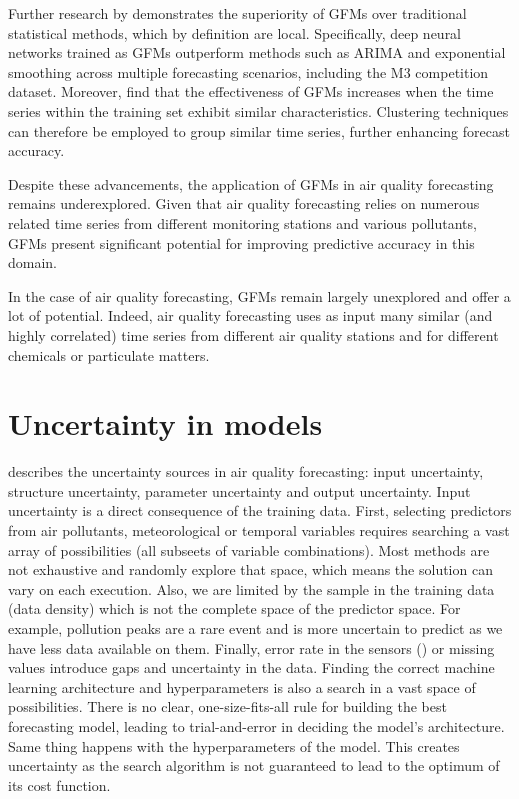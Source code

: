 \documentclass[12pt,a4paper]{book}
\begin{document}
Further research by \citet{hewamalage_advancing_2022} demonstrates the superiority of GFMs over traditional statistical methods, which by definition are local. Specifically, deep neural networks trained as GFMs outperform methods such as ARIMA and exponential smoothing across multiple forecasting scenarios, including the M3 competition dataset. Moreover, \citet{bandara_forecasting_2020} find that the effectiveness of GFMs increases when the time series within the training set exhibit similar characteristics. Clustering techniques can therefore be employed to group similar time series, further enhancing forecast accuracy.

Despite these advancements, the application of GFMs in air quality forecasting remains underexplored. Given that air quality forecasting relies on numerous related time series from different monitoring stations and various pollutants, GFMs present significant potential for improving predictive accuracy in this domain.

In the case of air quality forecasting, GFMs remain largely unexplored and offer a lot of potential. Indeed, air quality forecasting uses as input many similar (and highly correlated) time series from different air quality stations and for different chemicals or particulate matters.

\section{Uncertainty in models}
\citet{cabaneros_methods_2022} describes the uncertainty sources in air quality forecasting: input uncertainty, structure uncertainty, parameter uncertainty and output uncertainty. Input uncertainty is a direct consequence of the training data. First, selecting predictors from air pollutants, meteorological or temporal variables requires searching a vast array of possibilities (all subseets of variable combinations). Most methods are not exhaustive and randomly explore that space, which means the solution can vary on each execution. Also, we are limited by the sample in the training data (data density) which is not the complete space of the predictor space. For example, pollution peaks are a rare event and is more uncertain to predict as we have less data available on them. Finally, error rate in the sensors (\citep{peters_evaluating_2022, gerboles_estimation_2010}) or missing values introduce gaps and uncertainty in the data. Finding the correct machine learning architecture and hyperparameters is also a search in a vast space of possibilities. There is no clear, one-size-fits-all rule for building the best forecasting model, leading to trial-and-error in deciding the model's architecture. Same thing happens with the hyperparameters of the model. This creates uncertainty as the search algorithm is not guaranteed to lead to the optimum of its cost function. 
\end{document}
